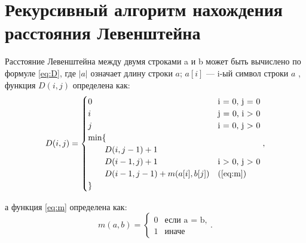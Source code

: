 \documentclass[12pt]{report}
\begin{document}
	\section{Рекурсивный алгоритм нахождения расстояния Левенштейна}
	
	Расстояние Левенштейна между двумя строками a и b может быть вычислено по формуле \ref{eq:D}, где $|a|$ означает длину строки $a$; $a[i]$ — i-ый символ строки $a$ , функция $D(i, j)$ определена как:
	\begin{equation}
		\label{eq:D}
		D(i, j) = \begin{cases}
			0 &\text{i = 0, j = 0}\\
			i &\text{j = 0, i > 0}\\
			j &\text{i = 0, j > 0}\\
			\min \lbrace \\
			\qquad D(i, j-1) + 1\\
			\qquad D(i-1, j) + 1 &\text{i > 0, j > 0}\\
			\qquad D(i-1, j-1) + m(a[i], b[j]) &\text(\ref{eq:m})\\
			\rbrace
		\end{cases},
	\end{equation}
	
	а функция \ref{eq:m} определена как:
	\begin{equation}
		\label{eq:m}
		m(a, b) = \begin{cases}
			0 &\text{если a = b,}\\
			1 &\text{иначе}
		\end{cases}.
	\end{equation}
	
\end{document}
